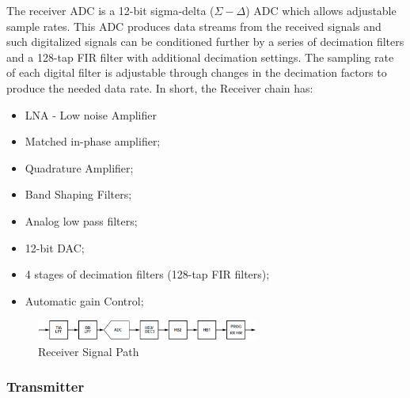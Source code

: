 The receiver ADC is a 12-bit sigma-delta ($\Sigma-\Delta$) ADC which allows
adjustable sample rates. This ADC produces data streams from the received
signals and such digitalized signals can be conditioned further by a series of
decimation filters and a 128-tap FIR filter with additional decimation settings.
The sampling rate of each digital filter is adjustable through changes in the
decimation factors to produce the needed data rate.
In short, the Receiver chain has:

\begin{itemize}
	\item LNA - Low noise Amplifier
	\item Matched in-phase amplifier;
	\item Quadrature Amplifier;
	\item Band Shaping Filters;
	\item Analog low pass filters;
	\item 12-bit DAC;
	\item 4 stages of decimation filters (128-tap FIR filters);
	\item Automatic gain Control;
\end{itemize}

\begin{figure}[htbp]
    \centering
    \includegraphics[width=0.65\textwidth]{./figures/rx_chain}
    \caption{ Receiver Signal Path
    \label{fig:rxchain}}
\end{figure}


\subsubsection{Transmitter}


